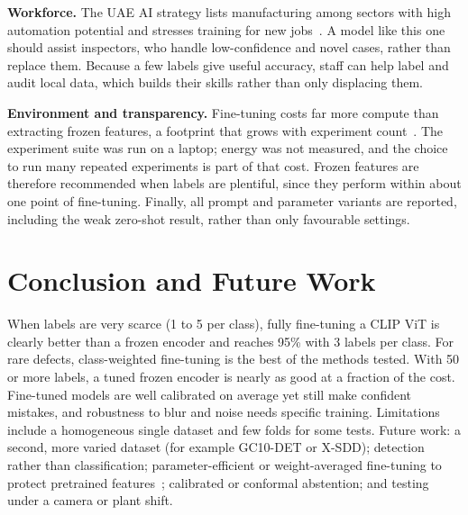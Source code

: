 \documentclass[11pt,a4paper]{article}
\begin{document}
\textbf{Workforce.} The UAE AI strategy lists manufacturing among sectors with high automation potential and stresses training for new jobs~\cite{uaeai}. A model like this one should assist inspectors, who handle low-confidence and novel cases, rather than replace them. Because a few labels give useful accuracy, staff can help label and audit local data, which builds their skills rather than only displacing them.

\textbf{Environment and transparency.} Fine-tuning costs far more compute than extracting frozen features, a footprint that grows with experiment count~\cite{strubell}. The experiment suite was run on a laptop; energy was not measured, and the choice to run many repeated experiments is part of that cost. Frozen features are therefore recommended when labels are plentiful, since they perform within about one point of fine-tuning. Finally, all prompt and parameter variants are reported, including the weak zero-shot result, rather than only favourable settings.

\section{Conclusion and Future Work}
When labels are very scarce (1 to 5 per class), fully fine-tuning a CLIP ViT is clearly better than a frozen encoder and reaches 95\% with 3 labels per class. For rare defects, class-weighted fine-tuning is the best of the methods tested. With 50 or more labels, a tuned frozen encoder is nearly as good at a fraction of the cost. Fine-tuned models are well calibrated on average yet still make confident mistakes, and robustness to blur and noise needs specific training. Limitations include a homogeneous single dataset and few folds for some tests. Future work: a second, more varied dataset (for example GC10-DET or X-SDD); detection rather than classification; parameter-efficient or weight-averaged fine-tuning to protect pretrained features~\cite{kumar}; calibrated or conformal abstention; and testing under a camera or plant shift.



\end{document}
